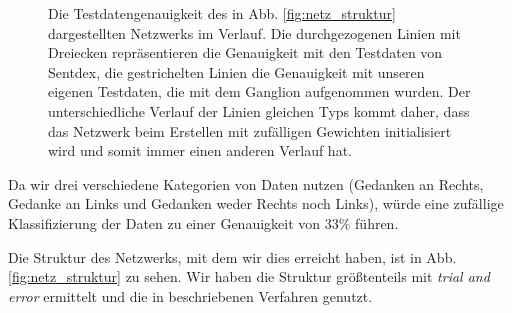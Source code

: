 \documentclass[10pt]{article}
\newcommand{\eng}[1]{\textit{#1}}
\begin{document}
\begin{figure}[h!]
    \caption{Die Testdatengenauigkeit des in Abb. \ref{fig:netz_struktur} dargestellten Netzwerks im Verlauf. Die durchgezogenen Linien mit Dreiecken repräsentieren die Genauigkeit mit den Testdaten von Sentdex, die gestrichelten Linien die Genauigkeit mit unseren eigenen Testdaten, die mit dem Ganglion aufgenommen wurden. Der unterschiedliche Verlauf der Linien gleichen Typs kommt daher, dass das Netzwerk beim Erstellen mit zufälligen Gewichten initialisiert wird und somit immer einen anderen Verlauf hat.}
    \label{fig:test_verlauf}
\end{figure}

Da wir drei verschiedene Kategorien von Daten nutzen (Gedanken an Rechts, Gedanke an Links und Gedanken weder Rechts noch Links), würde eine zufällige Klassifizierung der Daten zu einer Genauigkeit von 33\% führen.


Die Struktur des Netzwerks, mit dem wir dies erreicht haben, ist in Abb. \ref{fig:netz_struktur} zu sehen.
Wir haben die Struktur größtenteils mit \eng{trial and error} ermittelt und die in  beschriebenen Verfahren genutzt.
\end{document}
